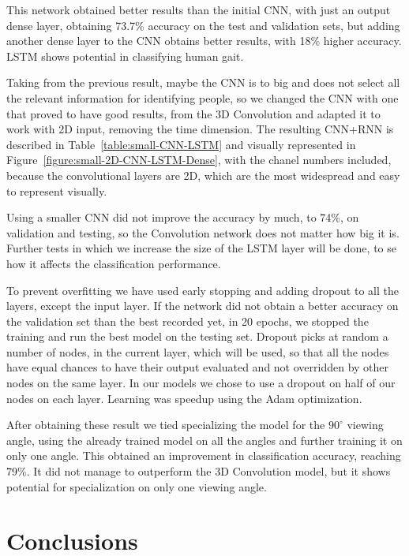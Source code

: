 \documentclass[12pt]{article}
\theoremstyle{definition}
\begin{document}
	This network obtained better results than the initial CNN, with just an output dense layer, obtaining 73.7\% accuracy on the test and validation sets, but adding another dense layer to the CNN obtains better results, with 18\% higher accuracy. LSTM shows potential in classifying human gait.

	Taking from the previous result, maybe the CNN is to big and does not select all the relevant information for identifying people, so we changed the CNN with one that proved to have good results, from the 3D Convolution and adapted it to work with 2D input, removing the time dimension. The resulting CNN+RNN is described in Table~\ref{table:small-CNN-LSTM} and visually represented in Figure~\ref{figure:small-2D-CNN-LSTM-Dense}, with the chanel numbers included, because the convolutional layers are 2D, which are the most widespread and easy to represent visually.

	Using a smaller CNN did not improve the accuracy by much, to 74\%, on validation and testing, so the Convolution network does not matter how big it is. Further tests in which we increase the size of the LSTM layer will be done, to se how it affects the classification performance.

	To prevent overfitting we have used early stopping and adding dropout to all the layers, except the input layer. If the network did not obtain a better accuracy on the validation set than the best recorded yet, in 20 epochs, we stopped the training and run the best model on the testing set. Dropout picks at random a number of nodes, in the current layer, which will be used, so that all the nodes have equal chances to have their output evaluated and not overridden by other nodes on the same layer. In our models we chose to use a dropout on half of our nodes on each layer. Learning was speedup using the Adam optimization.

	After obtaining these result we tied specializing the model for the $90^\circ$ viewing angle, using the already trained model on all the angles and further training it on only one angle. This obtained an improvement in classification accuracy, reaching 79\%. It did not manage to outperform the 3D Convolution model, but it shows potential for specialization on only one viewing angle.

	\clearpage

	\section{Conclusions}
	\vspace{1cm}
\end{document}
